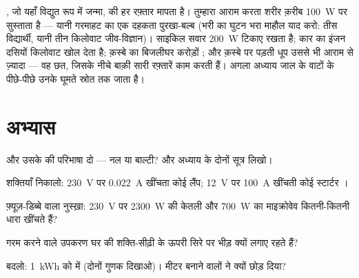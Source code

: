 \begin{remark}[बड़ी दुनिया में शक्ति]\label{rem:g9:electric-power-energy:wider}
, जो यहाँ विद्युत रूप में जन्मा,  की हर रफ़्तार मापता है।
तुम्हारा आराम करता शरीर क़रीब \qty{100}{W} पर सुस्ताता है --- यानी
गरमाहट का एक दहकता पुरखा-बल्ब (भरी  का घुटन भरा माहौल याद करो:
तीस विद्यार्थी, यानी तीन किलोवाट जीव-विज्ञान)। साइकिल सवार
\qty{200}{W} टिकाए रखता है; कार का इंजन दसियों किलोवाट खोल देता है;
क़स्बे का बिजलीघर करोड़ों ; और क़स्बे पर पड़ती धूप उससे भी आराम से
ज़्यादा --- वह छत, जिसके नीचे बाक़ी सारी रफ़्तारें काम करती हैं।
अगला अध्याय जाल के वाटों के पीछे-पीछे उनके घूमते स्रोत तक जाता है।
\end{remark}

\section{अभ्यास}

\begin{exercise}[$\star$]\label{exo:g9:electric-power-energy:1}
 और उसके  की परिभाषा दो --- नल या बाल्टी? और अध्याय के
दोनों सूत्र लिखो।
\end{exercise}

\begin{exercise}[$\star$]\label{exo:g9:electric-power-energy:2}
शक्तियाँ निकालो: \qty{230}{V} पर \qty{0.022}{A} खींचता कोई लैंप;
\qty{12}{V} पर \qty{100}{A} खींचती कोई स्टार्टर ।
\end{exercise}

\begin{exercise}[$\star$]\label{exo:g9:electric-power-energy:3}
फ़्यूज़-डिब्बे वाला नुस्ख़ा: \qty{230}{V} पर \qty{2300}{W} की केतली और
\qty{700}{W} का माइक्रोवेव कितनी-कितनी धारा खींचते हैं?
\end{exercise}

\begin{exercise}[$\star$]\label{exo:g9:electric-power-energy:4}
गरम करने वाले उपकरण घर की शक्ति-सीढ़ी के ऊपरी सिरे पर भीड़ क्यों लगाए
रहते हैं?
\end{exercise}

\begin{exercise}[$\star$]\label{exo:g9:electric-power-energy:5}
बदलो: \qty{1}{kWh} को  में (दोनों गुणक दिखाओ)। मीटर बनाने वालों ने
 क्यों छोड़ दिया?
\end{exercise}


